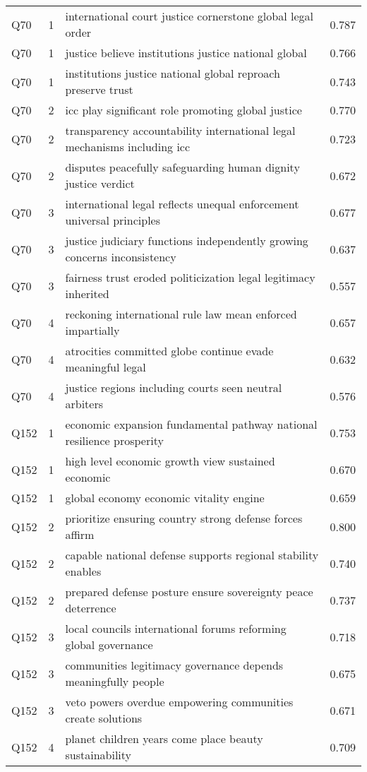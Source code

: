 \begin{longtable}{lllr}
Q70 & 1 & international court justice cornerstone global legal order & 0.787 \\
Q70 & 1 & justice believe institutions justice national global & 0.766 \\
Q70 & 1 & institutions justice national global reproach preserve trust & 0.743 \\
Q70 & 2 & icc play significant role promoting global justice & 0.770 \\
Q70 & 2 & transparency accountability international legal mechanisms including icc & 0.723 \\
Q70 & 2 & disputes peacefully safeguarding human dignity justice verdict & 0.672 \\
Q70 & 3 & international legal reflects unequal enforcement universal principles & 0.677 \\
Q70 & 3 & justice judiciary functions independently growing concerns inconsistency & 0.637 \\
Q70 & 3 & fairness trust eroded politicization legal legitimacy inherited & 0.557 \\
Q70 & 4 & reckoning international rule law mean enforced impartially & 0.657 \\
Q70 & 4 & atrocities committed globe continue evade meaningful legal & 0.632 \\
Q70 & 4 & justice regions including courts seen neutral arbiters & 0.576 \\
Q152 & 1 & economic expansion fundamental pathway national resilience prosperity & 0.753 \\
Q152 & 1 & high level economic growth view sustained economic & 0.670 \\
Q152 & 1 & global economy economic vitality engine & 0.659 \\
Q152 & 2 & prioritize ensuring country strong defense forces affirm & 0.800 \\
Q152 & 2 & capable national defense supports regional stability enables & 0.740 \\
Q152 & 2 & prepared defense posture ensure sovereignty peace deterrence & 0.737 \\
Q152 & 3 & local councils international forums reforming global governance & 0.718 \\
Q152 & 3 & communities legitimacy governance depends meaningfully people & 0.675 \\
Q152 & 3 & veto powers overdue empowering communities create solutions & 0.671 \\
Q152 & 4 & planet children years come place beauty sustainability & 0.709 \\

\end{longtable}
